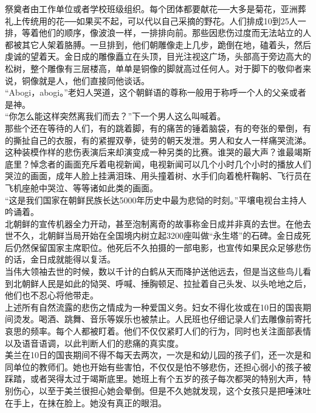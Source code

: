 祭奠者由工作单位或者学校班级组织。每个团体都要献花──大多是菊花，亚洲葬礼上传统用的花──如果买不起，可以代以自己采摘的野花。人们排成10到25人一排，等着他们的顺序，像波浪一样，一排排向前。那些因悲伤过度而无法站立的人都被其它人架着胳膊。一旦排到，他们朝雕像走上几步，跪倒在地，磕着头，然后虔诚的望着天。金日成的雕像矗立在头顶，目光注视这广场，头部高于旁边高大的松树，整个雕像有三层楼高，单单是铜像的脚就高过任何人。对于脚下的敬仰者来说，铜像就是人，他们直接同他谈话。\\

“Abogi，abogi。”老妇人哭道，这个朝鲜语的尊称一般用于称呼一个人的父亲或者是神。\\

“你怎么能这样突然离我们而去？”下一个男人这么叫喊着。\\

那些个还在等待的人们，有的跳着脚，有的痛苦的锤着脑袋，有的夸张的晕倒，有的撕扯自己的衣服，有的紧握双拳，徒劳的朝天发泄。男人和女人一样痛哭流涕。\\

这种装模作样的悲伤表演后来却演变成一种另类的比赛。谁哭的最大声？谁最竭斯底里？悼念者的画面充斥着电视新闻，电视新闻可以几个小时几个小时的播放人们哭泣的画面，成年人脸上挂满泪珠、用头撞着树、水手们向着桅杆鞠躬、飞行员在飞机座舱中哭泣、等等诸如此类的画面。\\

“这是我们国家在朝鲜民族长达5000年历史中最为悲恸的时刻。”平壤电视台主持人吟诵着。\\

北朝鲜的宣传机器全力开动，甚至泡制离奇的故事称金日成并非真的去世。在他去世不久，北朝鲜当局开始在全国境内树立起3200座叫做“永生塔”的石碑。金日成死后仍然保留国家主席职位。他死后不久拍摄的一部电影，也宣传如果民众足够悲伤的话，金日成就能得以复活。\\

当伟大领袖去世的时候，数以千计的白鹤从天而降护送他远去，但是当这些鸟儿看到北朝鲜人民是如此的恸哭、呼喊、捶胸顿足、拉扯着自己头发、以头呛地之后，他们也不忍心将他带走。\\

上述所有自然流露的悲伤之情成为一种爱国义务。妇女不得化妆或在10日的国丧期间烫发。喝酒、跳舞、音乐等娱乐也被禁止。人民班也仔细记录人们去雕像前寄托哀思的频率。每个人都被盯着。他们不仅仅紧盯人们的行为，同时也关注面部表情以及语音语调，以此判断人们的悲痛的真实度。\\

美兰在10日的国丧期间不得不每天去两次，一次是和幼儿园的孩子们，还一次是和同单位的教师们。她也开始有些害怕，不仅仅是怕不够悲伤，还担心弱小的孩子被踩踏，或者哭得太过于竭斯底里。她班上有个五岁的孩子每次都哭的特别大声，特别伤心，以至于美兰很担心她会晕倒。但是不久她就发现，这个女孩只是把唾沫吐在手上，在抹在脸上。她没有真正的眼泪。\\

